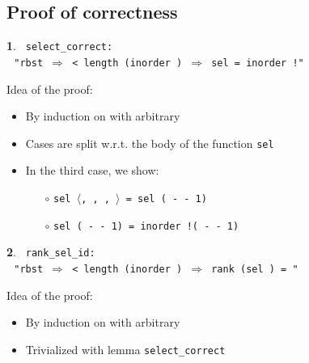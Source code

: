 \documentclass[10pt]{beamer}
\newcommand{\lm}{{\color{isa_blue}{lemma}}}
\newcommand{\isa}[1]{\texttt{#1}}
\newcommand{\blue}[1]{{\color{isa_dark_blue}{#1}}}
\newcommand{\green}[1]{{\color{isa_dark_green}{#1}}}
\theoremstyle{definition}
\newtheorem*{isabelle}{}
\begin{document}
\subsection{Proof of correctness}
\begin{frame}
  \begin{isabelle}
    \isa{
      \lm{} select\_correct:\\ $~~~$"rbst \blue{t} $\Longrightarrow$ \blue{i} < length (inorder \blue{t}) $\Longrightarrow$ sel \blue{i} \blue{t} = inorder \blue{t}!\blue{i}"
    }
  \end{isabelle}
  \vfill
  Idea of the proof:
  \begin{itemize}
    \item By induction on \isa{\blue{t}} with \isa{\blue{i}} arbitrary
    \item Cases are split w.r.t. the body of the function \isa{sel}
    \item In the third case, we show:
      \begin{itemize}
        \item[$\circ$] \isa{sel \blue{i} $\langle$\green{l}, \green{n}, \green{x}, \green{r}$\rangle$ = sel (\blue{i} - \green{n} - 1) \green{r}}
        \item[$\circ$] \isa{sel (\blue{i} - \green{n} - 1) \green{r} = inorder \green{r}!(\blue{i} - \green{n} - 1)}
      \end{itemize}
  \end{itemize}
\end{frame}

\begin{frame}
  \begin{isabelle}
    \isa{
      \lm{} rank\_sel\_id:\\ $~~~$"rbst \blue{t} $\Longrightarrow$ \blue{i} < length (inorder \blue{t}) $\Longrightarrow$ rank (sel \blue{i} \blue{t}) \blue{t} = \blue{i}"
    }
  \end{isabelle}
  \vfill
  Idea of the proof:
  \begin{itemize}
    \item By induction on \isa{\blue{t}} with \isa{\blue{i}} arbitrary
    \item Trivialized with lemma \texttt{select\_correct}
  \end{itemize}
\end{frame}
\end{document}
